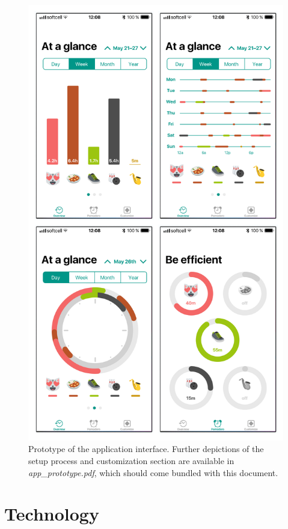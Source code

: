 \documentclass{article}
\begin{document}
\begin{figure}[H]
\centering
\includegraphics[scale=1]{app_screens.png}
\caption{Prototype of the application interface. Further depictions of the setup process and customization section are available in \textit{app\_prototype.pdf}, which should come bundled with this document. }
\label{fig:app}
\end{figure}

\newpage

\section{Technology}
\end{document}

